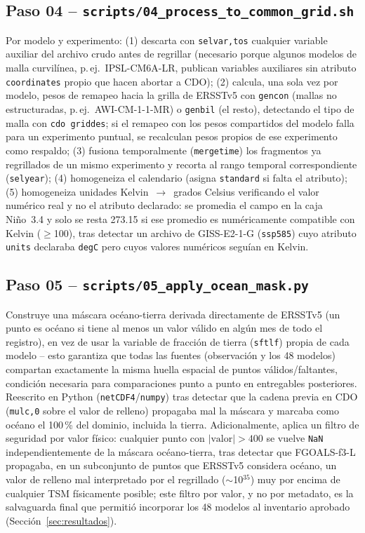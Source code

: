 \documentclass[11pt,a4paper]{article}
\begin{document}
\subsection{Paso 04 -- \texttt{scripts/04\_process\_to\_common\_grid.sh}}
\label{sec:paso04}
Por modelo y experimento: (1) descarta con \texttt{selvar,tos} cualquier variable auxiliar del archivo crudo antes de regrillar (necesario porque algunos modelos de malla curvil\'inea, p.\,ej.\ IPSL-CM6A-LR, publican variables auxiliares sin atributo \texttt{coordinates} propio que hacen abortar a CDO); (2) calcula, una sola vez por modelo, pesos de remapeo hacia la grilla de ERSSTv5 con \texttt{gencon} (mallas no estructuradas, p.\,ej.\ AWI-CM-1-1-MR) o \texttt{genbil} (el resto), detectando el tipo de malla con \texttt{cdo griddes}; si el remapeo con los pesos compartidos del modelo falla para un experimento puntual, se recalculan pesos propios de ese experimento como respaldo; (3) fusiona temporalmente (\texttt{mergetime}) los fragmentos ya regrillados de un mismo experimento y recorta al rango temporal correspondiente (\texttt{selyear}); (4) homogeneiza el calendario (asigna \texttt{standard} si falta el atributo); (5) homogeneiza unidades Kelvin~$\to$~grados Celsius verificando el valor num\'erico real y no el atributo declarado: se promedia el campo en la caja Ni\~no~3.4 y solo se resta 273.15 si ese promedio es num\'ericamente compatible con Kelvin ($\geq$100), tras detectar un archivo de GISS-E2-1-G (\texttt{ssp585}) cuyo atributo \texttt{units} declaraba \texttt{degC} pero cuyos valores num\'ericos segu\'ian en Kelvin.

\subsection{Paso 05 -- \texttt{scripts/05\_apply\_ocean\_mask.py}}
\label{sec:paso05}
Construye una m\'ascara oc\'eano-tierra derivada directamente de ERSSTv5 (un punto es oc\'eano si tiene al menos un valor v\'alido en alg\'un mes de todo el registro), en vez de usar la variable de fracci\'on de tierra (\texttt{sftlf}) propia de cada modelo -- esto garantiza que todas las fuentes (observaci\'on y los 48 modelos) compartan exactamente la misma huella espacial de puntos v\'alidos/faltantes, condici\'on necesaria para comparaciones punto a punto en entregables posteriores. Reescrito en Python (\texttt{netCDF4}/\texttt{numpy}) tras detectar que la cadena previa en CDO (\texttt{mulc,0} sobre el valor de relleno) propagaba mal la m\'ascara y marcaba como oc\'eano el 100\,\% del dominio, incluida la tierra. Adicionalmente, aplica un filtro de seguridad por valor f\'isico: cualquier punto con $|\text{valor}| > 400$ se vuelve \texttt{NaN} independientemente de la m\'ascara oc\'eano-tierra, tras detectar que FGOALS-f3-L propagaba, en un subconjunto de puntos que ERSSTv5 considera oc\'eano, un valor de relleno mal interpretado por el regrillado ($\sim$10$^{35}$) muy por encima de cualquier TSM f\'isicamente posible; este filtro por valor, y no por metadato, es la salvaguarda final que permiti\'o incorporar los 48 modelos al inventario aprobado (Secci\'on~\ref{sec:resultados}).
\end{document}
